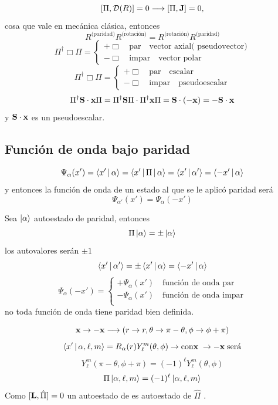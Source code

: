 \documentclass[10pt,oneside]{CBFT_book}
\begin{document}
\[
	[\Pi,\mathcal{D}(R)] = 0 \longrightarrow [\Pi,\vb{J}] = 0 ,
\]
cosa que vale en mecánica clásica, entonces 
\[
	R^{\text{(paridad)}}R^{\text{(rotación)}} = R^{\text{(rotación)}} R^{\text{(paridad)}}
\]
\[
	\Pi^\dagger \Box \Pi =  \begin{cases} +{\Box} \quad \text{par}\quad\text{vector axial( 
	pseudovector)}\\  -\Box \quad \text{impar} \quad \text{vector polar} \end{cases}
\]
\[
	\Pi^\dagger \Box \Pi =  \begin{cases} +\Box \quad \text{par}\quad\text{escalar}\\
	-\Box \quad \text{impar} \quad \text{pseudoescalar} \end{cases}
\]
\[
	\Pi^\dagger \vb{S}\cdot\vb{x} \Pi = \Pi^\dagger \vb{S}\Pi \cdot\Pi^\dagger\vb{x} \Pi =
	\vb{S}\cdot(-\vb{x}) = -\vb{S}\cdot\vb{x}
\]
y $\vb{S}\cdot\vb{x}$ es un pseudoescalar.

\subsection{Función de onda bajo paridad}

\[
	\Psi_\alpha(x') = \Braket{x'|\alpha} = \Braket{x'|\Pi|\alpha} = \Braket{x'|\alpha'} = 
	\Braket{-x'|\alpha}
\]
y entonces la función de onda de un estado al que se le aplicó paridad será 
\[
	\Psi_{\alpha'}(x') = \Psi_\alpha(-x')
\]

Sea $\Ket{\alpha}$ autoestado de paridad, entonces 
\[
	\Pi\Ket{\alpha} = \pm \Ket{\alpha}
\]
los autovalores serán $\pm 1$
\[
	\Braket{x'|\alpha'} = \pm \Braket{x'|\alpha} = \Braket{-x'|\alpha} 
\]
\[
	\Psi_\alpha(-x') = \begin{cases} +\Psi_\alpha(x') \quad \text{función de onda par}\\ 
	-\Psi_\alpha(x') \quad \text{función de onda impar}\\ 
	\end{cases}
\]
no toda función de onda tiene paridad bien definida.

\[
	\vb{x} \to -\vb{x} \longrightarrow \left( r\to r, \theta \to \pi-\theta, \phi \to \phi+\pi \right)
\]
\[
	\Braket{x'|\alpha,\ell,m} = R_\alpha(r) Y_\ell^m(\theta,\phi) \rightarrow \text{con}\vb{x} \; \to 
	-\vb{x} \; \text{será}
\]
\[
	Y_\ell^m(\pi-\theta,\phi+\pi) = (-1)^\ell Y_\ell^m(\theta,\phi)
\]
\[
	\Pi\Ket{\alpha,\ell,m} =  (-1)^\ell \Ket{\alpha,\ell,m}
\]
Como $[\vb{L},\hat{\Pi}]=0$ un autoestado de  es autoestado de $\hat{\Pi}$ .
\end{document}
